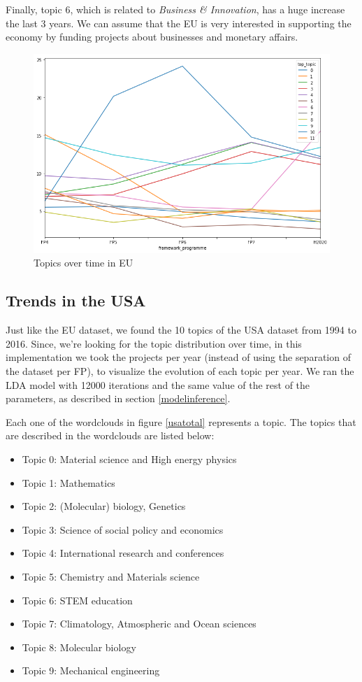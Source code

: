 \documentclass[12pt]{report}
\begin{document}
Finally, topic 6, which is related to \emph{Business \& Innovation}, has a huge
increase the last 3 years. We can assume that the EU is very interested in
supporting the economy by funding projects about businesses and monetary
affairs.
\begin{center}
\begin{figure}
\includegraphics[width=1.0\textwidth]
{figs/eu-topic-evolution.png}
\caption{Topics over time in EU}
\label{eutrend}
\end{figure}
\end{center}

\subsection{Trends in the USA}
\label{usaevolution}
Just like the EU dataset, we found the 10 topics of the USA dataset
from 1994 to 2016. Since, we're looking for the topic distribution
over time, in this implementation we took the projects per year
(instead of using the separation of the dataset per FP), to visualize
the evolution of each topic per year. We ran the LDA model with 12000
iterations and the same value of the rest of the
parameters, as described in section \ref{modelinference}.

Each one of the wordclouds in figure \ref{usatotal} represents a topic.
The topics that are described in the wordclouds are listed below:

\begin{itemize}
\item[] Topic 0: Material science and High energy physics
\item[] Topic 1: Mathematics
\item[] Topic 2: (Molecular) biology, Genetics
\item[] Topic 3: Science of social policy and economics
\item[] Topic 4: International research and conferences
\item[] Topic 5: Chemistry and Materials science
\item[] Topic 6: STEM education
\item[] Topic 7: Climatology, Atmospheric and Ocean sciences
\item[] Topic 8: Molecular biology 
\item[] Topic 9: Mechanical engineering
\end{itemize}
\end{document}

